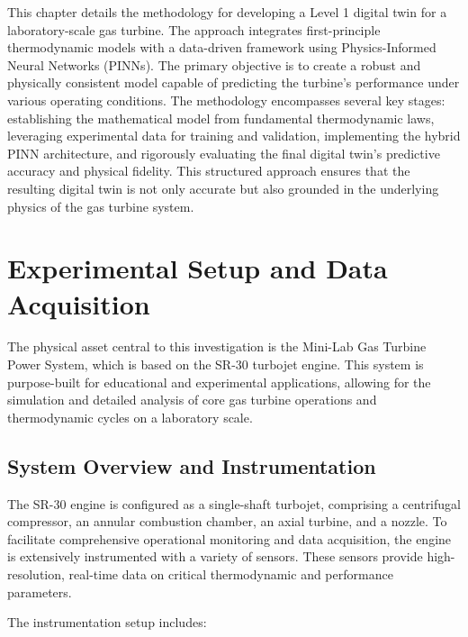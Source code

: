 \documentclass[
  12pt,
  oneside,
  a4paper,
  english,
  brazil]{abntex2}
\begin{document}
This chapter details the methodology for developing a Level 1 digital
twin for a laboratory-scale gas turbine. The approach integrates
first-principle thermodynamic models with a data-driven framework using
Physics-Informed Neural Networks (PINNs). The primary objective is to
create a robust and physically consistent model capable of predicting
the turbine's performance under various operating conditions. The
methodology encompasses several key stages: establishing the
mathematical model from fundamental thermodynamic laws, leveraging
experimental data for training and validation, implementing the hybrid
PINN architecture, and rigorously evaluating the final digital twin's
predictive accuracy and physical fidelity. This structured approach
ensures that the resulting digital twin is not only accurate but also
grounded in the underlying physics of the gas turbine system.

\section{\texorpdfstring{\textbf{Experimental Setup and Data
Acquisition}}{Experimental Setup and Data Acquisition}}\label{experimental-setup-and-data-acquisition}

The physical asset central to this investigation is the Mini-Lab Gas
Turbine Power System, which is based on the SR-30 turbojet engine. This
system is purpose-built for educational and experimental applications,
allowing for the simulation and detailed analysis of core gas turbine
operations and thermodynamic cycles on a laboratory scale.

\subsection{System Overview and
Instrumentation}\label{system-overview-and-instrumentation}

The SR-30 engine is configured as a single-shaft turbojet, comprising a
centrifugal compressor, an annular combustion chamber, an axial turbine,
and a nozzle. To facilitate comprehensive operational monitoring and
data acquisition, the engine is extensively instrumented with a variety
of sensors. These sensors provide high-resolution, real-time data on
critical thermodynamic and performance parameters.

The instrumentation setup includes:
\end{document}
